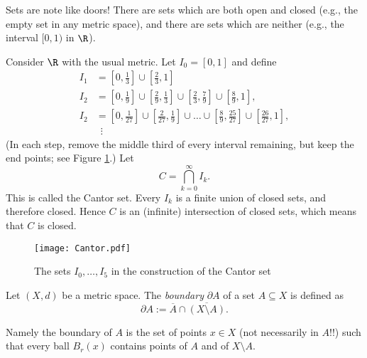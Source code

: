\bis

\begin{remark}
Sets are note like doors! There are sets
which are both open and closed (e.g., the empty set in any metric space), and there
are sets which are neither (e.g., the interval $[0,1)$ in $\R$).
\end{remark}

\np

\begin{example}[Cantor]\label{C:set}
Consider $\R$ with the usual metric. Let $I_0 = [0,1]$ and define
\begin{align*}
I_1 & = \textstyle [0,\frac{1}{3}] \cup [\frac{2}{3},1] \\
I_2 & = \textstyle [0,\frac{1}{9}] \cup [\frac{2}{9},\frac{1}{3}] \cup [\frac{2}{3},\frac{7}{9}] \cup [\frac{8}{9},1], \\
I_2 & = \textstyle [0,\frac{1}{27}] \cup [\frac{2}{27},\frac{1}{9}] \cup \ldots \cup  [\frac{8}{9},\frac{25}{27}] \cup [\frac{26}{27},1], \\
& \hspace{6pt} \vdots
\end{align*}
(In each step, remove the middle third of every interval remaining, but keep the end points; see Figure \ref{fig:Cantor}.)
Let
\[
C = \bigcap_{k = 0}^\infty I_k.
\]
This is called the Cantor set.  Every $I_k$ is a finite union of closed sets, and therefore closed.
Hence $C$ is an (infinite) intersection of closed sets, which means that $C$ is closed.
\begin{figure}[ht]
\begin{center}
\texttt{[image: Cantor.pdf]}
\end{center}
\caption{The sets $I_0,\ldots,I_5$ in the construction of the Cantor set}
\label{fig:Cantor}
\end{figure}
\end{example}

\np

\begin{definition}
Let $(X,d)$ be a metric space. The \emph{boundary} $\partial A$ of a set $A \subseteq X$ is defined as
$$
\partial A:= \overline A\cap \overline{(X\setminus A)}.
$$
\end{definition}

Namely the boundary of $A$ is the set of points $x\in X$ (not necessarily in $A$!!) such that every ball $B_r(x)$ contains points of $A$ and of $X\setminus A$.

